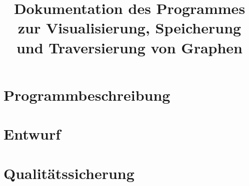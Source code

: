\documentclass[a4paper]{article}
\begin{document}
	

\newpage
\title{Dokumentation des Programmes zur Visualisierung, Speicherung und Traversierung von Graphen}


\newpage

\section{Programmbeschreibung}


\clearpage
\section{Entwurf}


\clearpage
\section{Qualitätssicherung}


\clearpage


\end{document}
